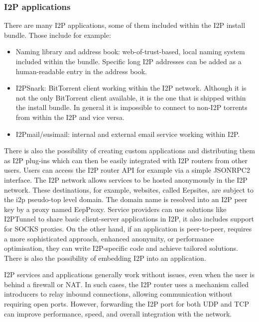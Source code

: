 \subsubsection{I2P applications}
There are many I2P applications, some of them included within the I2P install bundle. Those include for example:
\begin{itemize}
    \item Naming library and address book: web-of-trust-based, local naming system included within the bundle. Specific long I2P addresses can be added as a human-readable entry in the address book.
    \item I2PSnark: BitTorrent client working within the I2P network. Although it is not the only BitTorrent client available, it is the one that is shipped within the install bundle. In general it is impossible to connect to non-I2P torrents from within the I2P and vice versa.
    \item I2Pmail/susimail: internal and external email service working within I2P.
\end{itemize}
There is also the possibility of creating custom applications and distributing them as I2P plug-ins which can then be easily integrated with I2P routers from other users. Users can access the I2P router API for example via a simple JSONRPC2 interface. 
The I2P network allows services to be hosted anonymously in the I2P network. These destinations, for example, websites, called Eepsites, are subject to the i2p pseudo-top level domain. The domain name is resolved into an I2P peer key by a proxy named EepProxy. Service providers can use solutions like I2PTunnel to share basic client-server applications in I2P, it also includes support for SOCKS proxies. On the other hand, if an application is peer-to-peer, requires a more sophisticated approach, enhanced anonymity, or performance optimisation, they can write I2P-specific code and achieve tailored solutions. There is also the possibility of embedding I2P into an application.

I2P services and applications generally work without issues, even when the user is behind a firewall or NAT. In such cases, the I2P router uses a mechanism called introducers to relay inbound connections, allowing communication without requiring open ports. However, forwarding the I2P port for both UDP and TCP can improve performance, speed, and overall integration with the network.

